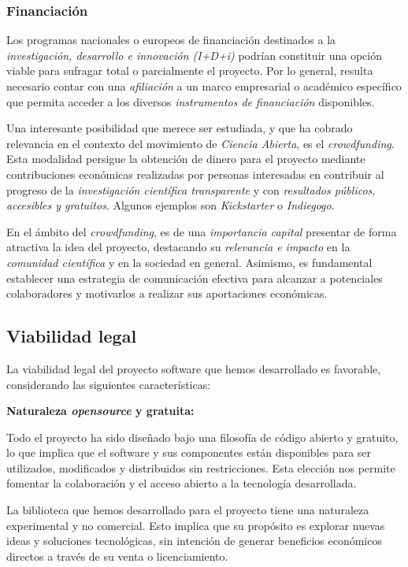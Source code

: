\subsubsection{Financiación}

Los programas nacionales o europeos de financiación destinados a la \textit{investigación, desarrollo e innovación (I+D+i)} 
podrían constituir una opción viable para sufragar total o parcialmente el proyecto. Por lo general, resulta necesario contar 
con una \textit{afiliación} a un marco empresarial o académico específico que permita acceder a los 
diversos \textit{instrumentos de financiación} disponibles.

Una interesante posibilidad que merece ser estudiada, y que ha cobrado relevancia en el contexto del movimiento 
de \textit{Ciencia Abierta}, es el \textit{crowdfunding}. Esta modalidad persigue la obtención de dinero  
para el proyecto mediante contribuciones económicas realizadas por personas interesadas en contribuir al progreso 
de la \textit{investigación científica transparente} y con \textit{resultados públicos, accesibles y gratuitos}. Algunos ejemplos son
\textit{Kickstarter} o \textit{Indiegogo}.

En el ámbito del \textit{crowdfunding}, es de una \textit{importancia capital} presentar de forma atractiva 
la idea del proyecto, destacando su \textit{relevancia e impacto} en la \textit{comunidad científica} y en 
la sociedad en general. Asimismo, es fundamental establecer una estrategia de comunicación efectiva 
para alcanzar a potenciales colaboradores y motivarlos a realizar sus aportaciones económicas.


\subsection{Viabilidad legal}

La viabilidad legal del proyecto software que hemos desarrollado es favorable, considerando las siguientes características:

\textbf{Naturaleza \textit{opensource} y gratuita:} 

Todo el proyecto ha sido diseñado bajo una filosofía de código abierto y gratuito, 
lo que implica que el software y sus componentes están disponibles para ser utilizados, modificados y distribuidos sin 
restricciones. Esta elección nos permite fomentar la colaboración y el acceso abierto a la tecnología desarrollada.

La biblioteca que hemos desarrollado para el proyecto tiene 
una naturaleza experimental y no comercial. Esto implica que su propósito es explorar nuevas ideas y soluciones tecnológicas, 
sin intención de generar beneficios económicos directos a través de su venta o licenciamiento.

